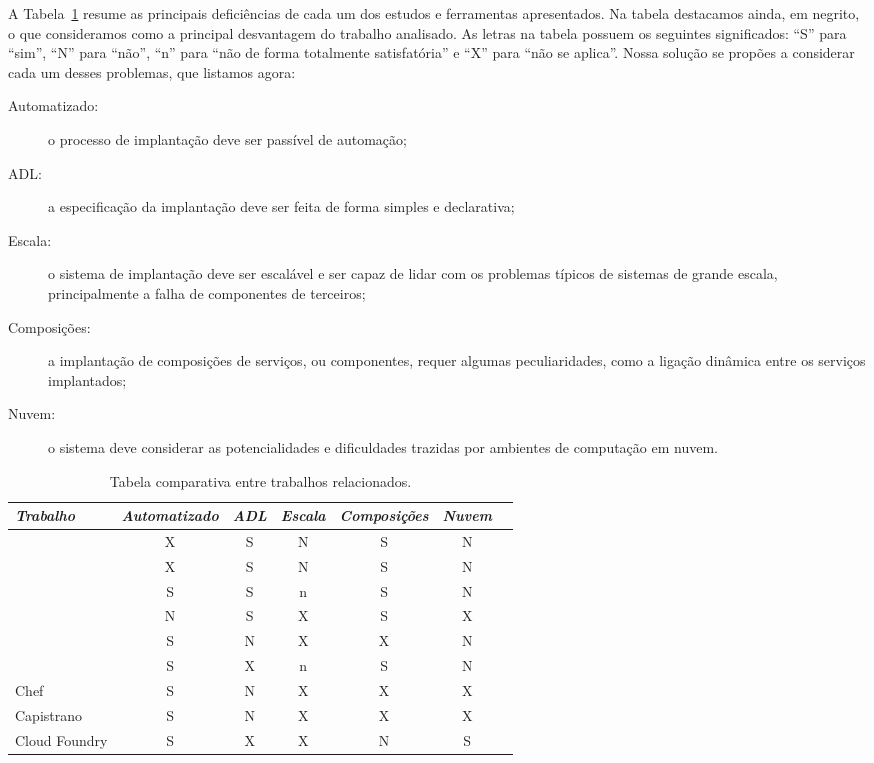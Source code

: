 A Tabela~\ref{tab:relacionados} resume as principais deficiências de cada um dos estudos e ferramentas apresentados. Na tabela destacamos ainda, em negrito, o que consideramos como a principal desvantagem do trabalho analisado. As letras na tabela possuem os seguintes significados: ``S'' para ``sim'', ``N'' para ``não'', ``n'' para ``não de forma totalmente satisfatória'' e ``X'' para ``não se aplica''.
Nossa solução se propões a considerar cada um desses problemas, que listamos agora:

\begin{description}
\item [Automatizado:] o processo de implantação deve ser passível de automação;
\item [ADL:] a especificação da implantação deve ser feita de forma simples e declarativa;
\item [Escala:] o sistema de implantação deve ser escalável e ser capaz de lidar com os problemas típicos de sistemas de grande escala, principalmente a falha de componentes de terceiros;
\item [Composições:] a implantação de composições de serviços, ou componentes, requer algumas peculiaridades, como a ligação dinâmica entre os serviços implantados;
\item [Nuvem:] o sistema deve considerar as potencialidades e dificuldades trazidas por ambientes de computação em nuvem.
\end{description}

\begin{table}[!t]
\begin{center}
    \begin{tabular}{l c c c c c c}
	 \hline
	 \itshape{Trabalho} & \itshape{Automatizado} & \itshape{ADL} & \itshape{Escala} & \itshape{Composições} & \itshape{Nuvem}  \\ \hline
    \cite{Magee1994Regis, Magee1996Dynamic} & X & S & N & S & N \\
    \cite{Balter1998Olan}   & X & S & N & S & N \\
    \cite{quema2004hierarchical}  & S & S & n & S & N \\
    \cite{akkerman2005j2ee}   & N & S & X & S & X \\
    \cite{Dolstra2005Configuration}   & S & N & X & X & N \\
    \cite{Watson2006Dynasoar}   & S & X & n & S & N \\
    Chef   & S & N & X & X & X \\
    Capistrano   & S & N & X & X & X \\
    Cloud Foundry   & S & X & X & N & S \\

    \end{tabular}
  \caption{Tabela comparativa entre trabalhos relacionados.}
  \label{tab:relacionados}
\end{center}
\end{table}




